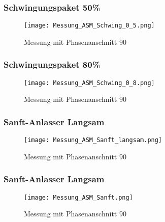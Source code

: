 \newpage
\subsubsection{Schwingungspaket 50\%}
\begin{figure}[ht!]
	\centering
	\texttt{[image: Messung\_ASM\_Schwing\_0\_5.png]}	
	\caption{Messung mit Phasenanschnitt 90\textdegree}\label{fig:Mess_ASM_Schwing_0_5}
\end{figure}

\newpage
\subsubsection{Schwingungspaket 80\%}
\begin{figure}[ht!]
	\centering
	\texttt{[image: Messung\_ASM\_Schwing\_0\_8.png]}	
	\caption{Messung mit Phasenanschnitt 90\textdegree}\label{fig:Mess_ASM_Schwing_0_8}
\end{figure}

\newpage
\subsubsection{Sanft-Anlasser Langsam}
\begin{figure}[ht!]
	\centering
	\texttt{[image: Messung\_ASM\_Sanft\_langsam.png]}	
	\caption{Messung mit Phasenanschnitt 90\textdegree}\label{fig:Mess_ASM_Sanft_langsam}
\end{figure}

\newpage
\subsubsection{Sanft-Anlasser Langsam}
\begin{figure}[ht!]
	\centering
	\texttt{[image: Messung\_ASM\_Sanft.png]}	
	\caption{Messung mit Phasenanschnitt 90\textdegree}\label{fig:Mess_ASM_Sanft}
\end{figure}

